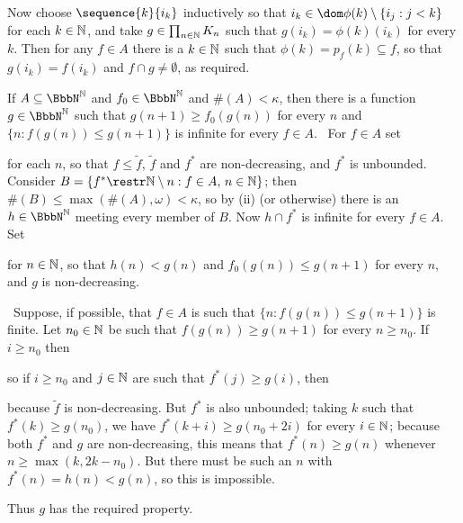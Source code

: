 {Now choose $\sequence{k}{i_k}$ inductively so that
$i_k\in\dom\phi(k)\setminus\{i_j:j<k\}$ for each $k\in\Bbb N$, and take
$g\in\prod_{n\in\Bbb N}K_n$ such that $g(i_k)=\phi(k)(i_k)$ for every
$k$.   Then for any $f\in A$ there is a $k\in\Bbb N$ such that
$\phi(k)=p_f(k)\subseteq f$, so that $g(i_k)=f(i_k)$ and $f\cap
g\ne\emptyset$,
as required.\ \Qed

\medskip

 If $A\subseteq\NN$ and $f_0\in\NN$ and $\#(A)<\kappa$,
then there is a function $g\in\NN$ such that
$g(n+1)\ge f_0(g(n))$ for every $n$ and
$\{n:f(g(n))\le g(n+1)\}$ is infinite for every $f\in A$.   \Prf\ For
$f\in A$ set


\noindent for each $n$, so that $f\le\tilde f$, $\tilde f$ and $f^*$ are
non-decreasing, and $f^*$ is unbounded.   Consider
$B=\{f^*\restr\Bbb N\setminus n:f\in A,\,n\in\Bbb N\}$;  then
$\#(B)\le\max(\#(A),\omega)<\kappa$, so by (ii) (or otherwise) there is
an $h\in\NN$ meeting every member of $B$.   Now $h\cap f^*$ is infinite
for every $f\in A$.   Set


\noindent for $n\in\Bbb N$, so that
$h(n)<g(n)$ and $f_0(g(n))\le g(n+1)$ for every
$n$, and $g$ is non-decreasing.

\Quer\ Suppose, if possible, that $f\in A$ is such that
$\{n:f(g(n))\le g(n+1)\}$ is finite.
Let $n_0\in\Bbb N$ be such that $f(g(n))\ge g(n+1)$ for every $n\ge n_0$.
If $i\ge n_0$ then


\noindent so if $i\ge n_0$ and $j\in\Bbb N$ are such that $f^*(j)\ge g(i)$,
then


\noindent because $\tilde f$ is non-decreasing.   But $f^*$ is also
unbounded;
taking $k$ such that $f^*(k)\ge g(n_0)$, we have $f^*(k+i)\ge g(n_0+2i)$
for every $i\in\Bbb N$;  because both $f^*$ and $g$ are
non-decreasing, this means that $f^*(n)\ge g(n)$ whenever
$n\ge\max(k,2k-n_0)$.   But there must be such an $n$ with
$f^*(n)=h(n)<g(n)$, so this is impossible.\ \Bang

Thus $g$ has the required property.\ \Qed

}
